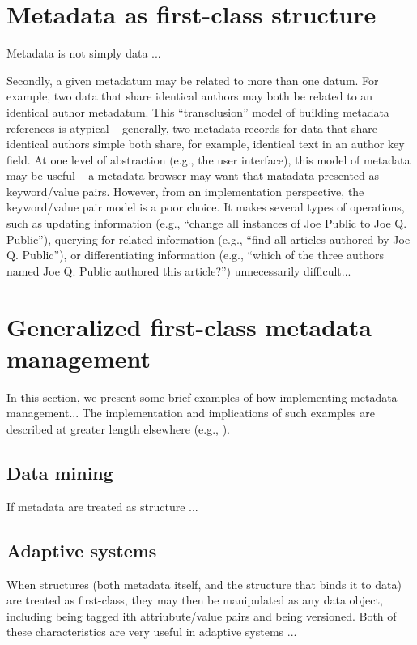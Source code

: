 \documentclass[10pt, a4paper, oneside]{article}
\begin{document}
\section{Metadata as first-class structure}

Metadata is not simply data ...

Secondly, a given metadatum may be related to more than one datum.
For example, two data that share identical authors may both be related
to an identical author metadatum.  This ``transclusion'' \cite{nelson}
model of building metadata references is atypical -- generally, two
metadata records for data that share identical authors simple both
share, for example, identical text in an author key field.  At one
level of abstraction (e.g., the user interface), this model of
metadata may be useful -- a metadata browser may want that matadata
presented as keyword/value pairs.  However, from an implementation
perspective, the keyword/value pair model is a poor choice.  It makes
several types of operations, such as updating information (e.g.,
``change all instances of Joe Public to Joe
Q. Public''), querying for related information (e.g., ``find all
articles authored by Joe Q. Public''), or differentiating
information (e.g., ``which of the three authors named Joe
Q. Public authored this article?'')  unnecessarily difficult...  

\section{Generalized first-class metadata management}

In this section, we present some brief examples of how implementing
metadata management... The implementation and implications of such
examples are described at greater length elsewhere (e.g.,
\cite{tois-ver, hoss}).

\subsection{Data mining}

If metadata are treated as structure ...

\subsection{Adaptive systems}

When structures (both metadata itself, and the structure that binds it
to data) are treated as first-class, they may then be manipulated as
any data object, including being tagged ith attriubute/value pairs and
being versioned.  Both of these characteristics are very useful in
adaptive systems \cite{adapt}...
\end{document}

